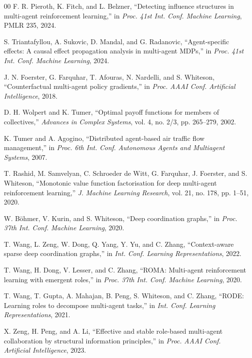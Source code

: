 \documentclass[conference]{IEEEtran}
\begin{document}
\begin{thebibliography}{00}
 F. R. Pieroth, K. Fitch, and L. Belzner, ``Detecting influence structures in multi-agent reinforcement learning,'' in \textit{Proc. 41st Int. Conf. Machine Learning}, PMLR 235, 2024.

 S. Triantafyllou, A. Sukovic, D. Mandal, and G. Radanovic, ``Agent-specific effects: A causal effect propagation analysis in multi-agent MDPs,'' in \textit{Proc. 41st Int. Conf. Machine Learning}, 2024.

 J. N. Foerster, G. Farquhar, T. Afouras, N. Nardelli, and S. Whiteson, ``Counterfactual multi-agent policy gradients,'' in \textit{Proc. AAAI Conf. Artificial Intelligence}, 2018.

 D. H. Wolpert and K. Tumer, ``Optimal payoff functions for members of collectives,'' \textit{Advances in Complex Systems}, vol. 4, no. 2/3, pp. 265--279, 2002.

 K. Tumer and A. Agogino, ``Distributed agent-based air traffic flow management,'' in \textit{Proc. 6th Int. Conf. Autonomous Agents and Multiagent Systems}, 2007.

 T. Rashid, M. Samvelyan, C. Schroeder de Witt, G. Farquhar, J. Foerster, and S. Whiteson, ``Monotonic value function factorisation for deep multi-agent reinforcement learning,'' \textit{J. Machine Learning Research}, vol. 21, no. 178, pp. 1--51, 2020.

 W. B\"{o}hmer, V. Kurin, and S. Whiteson, ``Deep coordination graphs,'' in \textit{Proc. 37th Int. Conf. Machine Learning}, 2020.

 T. Wang, L. Zeng, W. Dong, Q. Yang, Y. Yu, and C. Zhang, ``Context-aware sparse deep coordination graphs,'' in \textit{Int. Conf. Learning Representations}, 2022.

 T. Wang, H. Dong, V. Lesser, and C. Zhang, ``ROMA: Multi-agent reinforcement learning with emergent roles,'' in \textit{Proc. 37th Int. Conf. Machine Learning}, 2020.

 T. Wang, T. Gupta, A. Mahajan, B. Peng, S. Whiteson, and C. Zhang, ``RODE: Learning roles to decompose multi-agent tasks,'' in \textit{Int. Conf. Learning Representations}, 2021.

 X. Zeng, H. Peng, and A. Li, ``Effective and stable role-based multi-agent collaboration by structural information principles,'' in \textit{Proc. AAAI Conf. Artificial Intelligence}, 2023.


\end{thebibliography}
\end{document}

